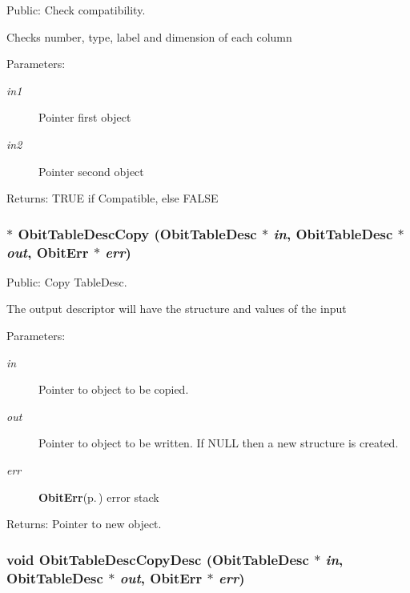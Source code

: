 Public: Check compatibility. 

Checks number, type, label and dimension of each column \begin{Desc}
\item[Parameters:]
\begin{description}
\item[{\em in1}]Pointer first object \item[{\em in2}]Pointer second object \end{description}
\end{Desc}
\begin{Desc}
\item[Returns:]TRUE if Compatible, else FALSE \end{Desc}
\subsubsection{$\ast$ Obit\-Table\-Desc\-Copy ({\bf Obit\-Table\-Desc} $\ast$ {\em in}, {\bf Obit\-Table\-Desc} $\ast$ {\em out}, {\bf Obit\-Err} $\ast$ {\em err})}\label{ObitTableDesc_8c_a6}


Public: Copy Table\-Desc. 

The output descriptor will have the structure and values of the input \begin{Desc}
\item[Parameters:]
\begin{description}
\item[{\em in}]Pointer to object to be copied. \item[{\em out}]Pointer to object to be written. If NULL then a new structure is created. \item[{\em err}]{\bf Obit\-Err}{\rm (p.\,\pageref{structObitErr})} error stack \end{description}
\end{Desc}
\begin{Desc}
\item[Returns:]Pointer to new object. \end{Desc}
\subsubsection{\setlength{\rightskip}{0pt plus 5cm}void Obit\-Table\-Desc\-Copy\-Desc ({\bf Obit\-Table\-Desc} $\ast$ {\em in}, {\bf Obit\-Table\-Desc} $\ast$ {\em out}, {\bf Obit\-Err} $\ast$ {\em err})}\label{ObitTableDesc_8c_a7}


